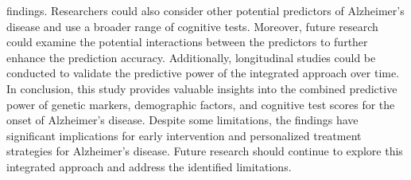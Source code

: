 \documentclass[conference]{IEEEtran}
\begin{document}
findings. Researchers could also consider other potential predictors of Alzheimer's disease and use a broader range of cognitive tests. Moreover, future research could examine the potential interactions between the predictors to further enhance the prediction accuracy. Additionally, longitudinal studies could be conducted to validate the predictive power of the integrated approach over time. In conclusion, this study provides valuable insights into the combined predictive power of genetic markers, demographic factors, and cognitive test scores for the onset of Alzheimer's disease. Despite some limitations, the findings have significant implications for early intervention and personalized treatment strategies for Alzheimer's disease. Future research should continue to explore this integrated approach and address the identified limitations.
\end{document}
